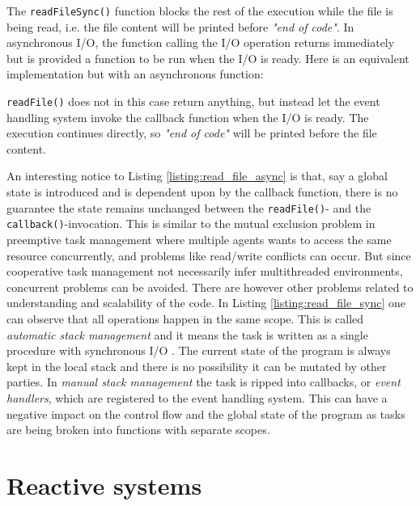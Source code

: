 

The \lstinline{readFileSync()} function blocks the rest of the execution while
the file is being read, i.e. the file content will be printed before
\textit{"end of code"}. In asynchronous I/O, the function calling the I/O
operation returns immediately but is provided a function to be run when the I/O
is ready. Here is an equivalent implementation but with an asynchronous
function:



\lstinline{readFile()} does not in this case return anything, but instead let
the event handling system invoke the callback function when the I/O is ready.
The execution continues directly, so \textit{"end of code"} will be printed
before the file content.

An interesting notice to Listing \ref{listing:read_file_async} is that, say a
global state is introduced and is dependent upon by the callback function,
there is no guarantee the state remains unchanged between the
\lstinline{readFile()}- and the \lstinline{callback()}-invocation. This is
similar to the mutual exclusion problem in preemptive task management where
multiple agents wants to access the same resource concurrently, and problems
like read/write conflicts can occur. But since cooperative task management not
necessarily infer multithreaded environments, concurrent problems can be
avoided. There are however other problems related to understanding and
scalability of the code. In Listing \ref{listing:read_file_sync} one can
observe that all operations happen in the same scope. This is called
\textit{automatic stack management} and it means the task is written as a
single procedure with synchronous I/O \cite{adya2002cooperative}. The current
state of the program is always kept in the local stack and there is no
possibility it can be mutated by other parties. In \textit{manual stack
management} the task is ripped into callbacks, or \textit{event handlers},
which are registered to the event handling system. This can have a negative
impact on the control flow and the global state of the program as tasks are
being broken into functions with separate scopes.

\section{Reactive systems}

